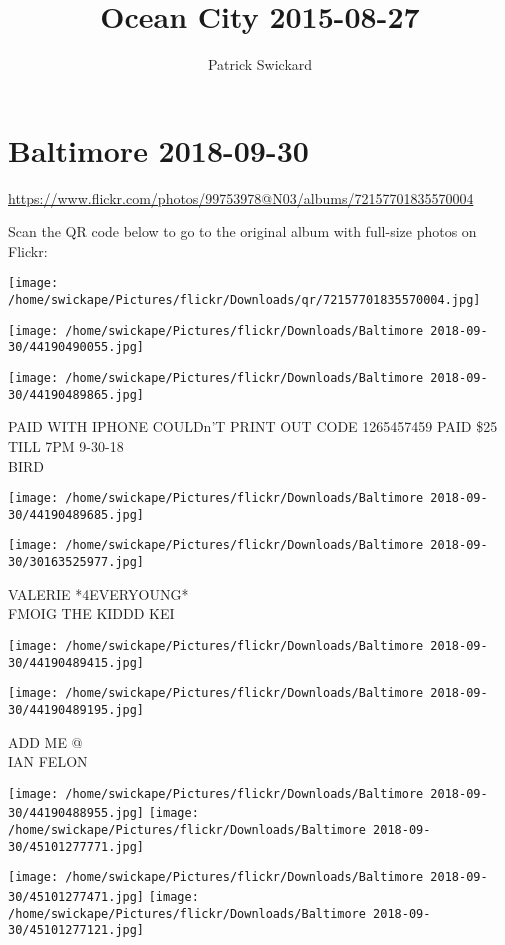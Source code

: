 \documentclass[10pt,letterpaper]{article}
\title{Ocean City 2015-08-27}
\author{Patrick Swickard}
\date{}
\begin{document}
\section*{Baltimore 2018-09-30}

\url{https://www.flickr.com/photos/99753978@N03/albums/72157701835570004}

Scan the QR code below to go to the original album with full-size photos on Flickr:

\texttt{[image: /home/swickape/Pictures/flickr/Downloads/qr/72157701835570004.jpg]}
\pagebreak

\texttt{[image: /home/swickape/Pictures/flickr/Downloads/Baltimore 2018-09-30/44190490055.jpg]}

\vspace{0.25in}
\texttt{[image: /home/swickape/Pictures/flickr/Downloads/Baltimore 2018-09-30/44190489865.jpg]}

PAID WITH IPHONE COULDn'T PRINT OUT CODE 1265457459 PAID \$25 TILL 7PM 9{-}30{-}18\\
BIRD
\pagebreak

\texttt{[image: /home/swickape/Pictures/flickr/Downloads/Baltimore 2018-09-30/44190489685.jpg]}

\vspace{0.25in}
\texttt{[image: /home/swickape/Pictures/flickr/Downloads/Baltimore 2018-09-30/30163525977.jpg]}

VALERIE *4EVERYOUNG*\\
FMOIG THE KIDDD KEI
\pagebreak

\texttt{[image: /home/swickape/Pictures/flickr/Downloads/Baltimore 2018-09-30/44190489415.jpg]}

\vspace{0.25in}
\texttt{[image: /home/swickape/Pictures/flickr/Downloads/Baltimore 2018-09-30/44190489195.jpg]}

ADD ME @\\
IAN FELON
\pagebreak

\texttt{[image: /home/swickape/Pictures/flickr/Downloads/Baltimore 2018-09-30/44190488955.jpg]}
\texttt{[image: /home/swickape/Pictures/flickr/Downloads/Baltimore 2018-09-30/45101277771.jpg]}

\texttt{[image: /home/swickape/Pictures/flickr/Downloads/Baltimore 2018-09-30/45101277471.jpg]}
\texttt{[image: /home/swickape/Pictures/flickr/Downloads/Baltimore 2018-09-30/45101277121.jpg]}
\end{document}
